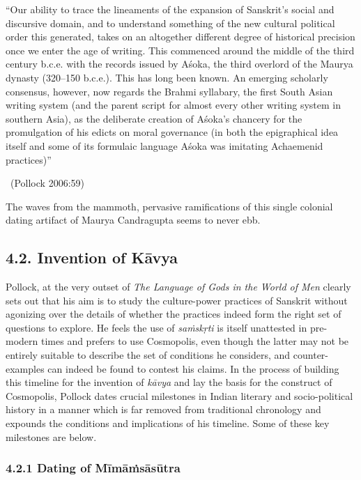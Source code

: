 \begin{myquote}
“Our ability to trace the lineaments of the expansion of Sanskrit’s social and discursive domain, and to understand something of the new cultural political order this generated, takes on an altogether different degree of historical precision once we enter the age of writing. This commenced around the middle of the third century b.c.e. with the records issued by Aśoka, the third overlord of the Maurya dynasty (320–150 b.c.e.). This has long been known. An emerging scholarly consensus, however, now regards the Brahmi syllabary, the first South Asian writing system (and the parent script for almost every other writing system in southern Asia), as the deliberate creation of Aśoka’s chancery for the promulgation of his edicts on moral governance (in both the epigraphical idea itself and some of its formulaic language Aśoka was imitating Achaemenid practices)” 

~\hfill (Pollock 2006:59)
\end{myquote}

The waves from the mammoth, pervasive ramifications of this single colonial dating artifact of Maurya Candragupta seems to never ebb.


\subsection*{4.2. Invention of Kāvya}

Pollock, at the very outset of \textit{The Language of Gods in the World of Men} clearly sets out that his aim is to study the culture-power practices of Sanskrit without agonizing over the details of whether the practices indeed form the right set of questions to explore. He feels the use of \textit{saṁskṛti} is itself unattested in pre-modern times and prefers to use Cosmopolis, even though the latter may not be entirely suitable to describe the set of conditions he considers, and counter-examples can indeed be found to contest his claims. In the process of building this timeline for the invention of \textit{kāvya} and lay the basis for the construct of Cosmopolis, Pollock dates crucial milestones in Indian literary and socio-political history in a manner which is far removed from traditional chronology and expounds the conditions and implications of his timeline. Some of these key milestones are below.

\subsubsection*{4.2.1 Dating of Mīmāṁsāsūtra}

